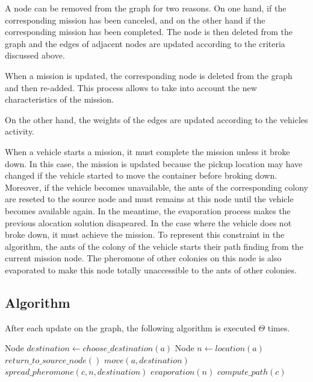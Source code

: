 \documentclass[a4paper,10pt]{article}
\begin{document}
A node can be removed from the graph for two reasons. On one hand, if the corresponding mission has been canceled, and on the other hand if the corresponding mission has been completed. The node is then deleted from the graph and the edges of adjacent nodes are updated according to the criteria discussed above.


When a mission is updated, the corresponding node is deleted from the graph and then re-added. This process allows to take into account the new characteristics of the mission.

On the other hand, the weights of the edges are updated according to the vehicles activity.

When a vehicle starts a mission, it must complete the mission unless it broke down. In this case, the mission is updated because the pickup location may have changed if the vehicle started to move the container before broking down. Moreover, if the vehicle becomes unavailable, the ants of the corresponding colony are reseted to the source node and must remains at this node until the vehicle becomes available again. In the meantime, the evaporation process makes the previous alocation solution disapeared.
In the case where the vehicle does not broke down, it must achieve the mission. To represent this constraint in the algorithm, the ants of the colony of the vehicle starts their path finding from the current mission node. The pheromone of other colonies on this node is also evaporated to make this node totally unaccessible to the ants of other colonies.

\subsection{Algorithm}

After each update on the graph, the following algorithm is executed $\Theta$ times.

\begin{algorithm}
\label{algo1}
\begin{algorithmic} 
\STATE Node $destination \leftarrow choose\_destination(a)$
\STATE Node $n \leftarrow location(a)$
\STATE $return\_to\_source\_node()$
\ELSE
\STATE $move(a, destination)$
\STATE $spread\_pheromone(c, n, destination)$
\ENDIF
\ENDFOR
{}
\STATE $evaporation(n)$
\ENDFOR
{}
\STATE $compute\_path(c)$
\ENDFOR
\end{algorithmic}
\end{algorithm}
\end{document}
